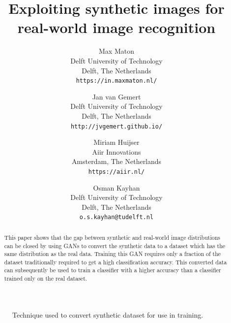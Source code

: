 \documentclass[10pt,twocolumn,letterpaper]{article}
\begin{document}
\title{ Exploiting synthetic images for real-world image recognition }

\author{Max Maton\\
Delft University of Technology\\
Delft, The Netherlands\\
{\tt\small https://in.maxmaton.nl/}
\and
Jan van Gemert\\
Delft University of Technology\\
Delft, The Netherlands\\
{\tt\small http://jvgemert.github.io/}
\and
Miriam Huijser\\
Aiir Innovations\\
Amsterdam, The Netherlands\\
{\tt\small https://aiir.nl/}
\and
Osman Kayhan\\
Delft University of Technology\\
Delft, The Netherlands\\
{\tt\small o.s.kayhan@tudelft.nl}
}

\maketitle

\begin{abstract}

This paper shows that the gap between synthetic and real-world image distributions can be closed by using GANs to convert the synthetic data to a dataset which has the same distribution as the real data. Training this GAN requires only a fraction of the dataset traditionally required to get a high classification accuracy. This converted data can subsequently be used to train a classifier with a higher accuracy than a classifier trained only on the real dataset.

\end{abstract}

\begin{figure}[h]
\begin{center}
\fbox{\rule{0pt}{2in} %
   {\scriptsize }%
}
\end{center}
   \caption{Technique used to convert synthetic dataset for use in training.}
\label{fig:method}
\end{figure}
\end{document}
